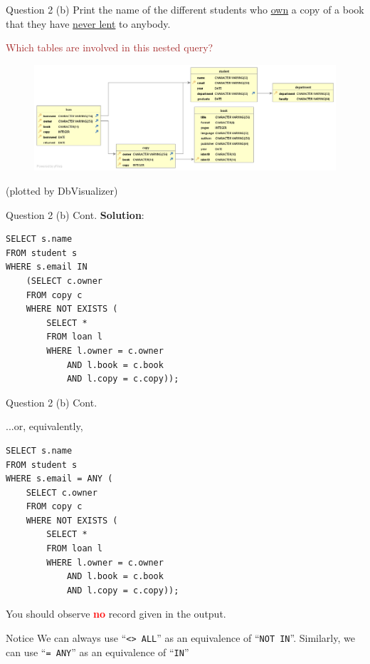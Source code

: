 \begin{frame}[fragile]{Question 2 (b)}
Print the name of the different students who \underline{own} a copy of a book that they have \underline{never lent} to anybody.\\ \vspace{5pt}

\textcolor{brown}{Which tables are involved in this nested query?}
\begin{figure}
	\includegraphics[width=1\textwidth]{t1/images/t1-end.png}
\end{figure}\vspace{-10pt}
{\tiny(plotted by DbVisualizer)}
\end{frame}

\begin{frame}[fragile]{Question 2 (b) Cont.}
\textbf{Solution}:
	
\begin{lstlisting}
SELECT s.name 
FROM student s
WHERE s.email IN 
	(SELECT c.owner
	FROM copy c
	WHERE NOT EXISTS (
		SELECT * 
		FROM loan l
		WHERE l.owner = c.owner
			AND l.book = c.book
			AND l.copy = c.copy));
\end{lstlisting}\vspace{5pt}
\end{frame}

\begin{frame}[fragile]{Question 2 (b) Cont.}
	
...or, equivalently,
	
\begin{lstlisting}
SELECT s.name 
FROM student s
WHERE s.email = ANY (
	SELECT c.owner
	FROM copy c
	WHERE NOT EXISTS (
		SELECT * 
		FROM loan l
		WHERE l.owner = c.owner
			AND l.book = c.book
			AND l.copy = c.copy));
\end{lstlisting}\vspace{5pt}
	
You should observe \textcolor{red}{\textbf{no}} record given in the output. \\

\begin{block}{Notice}
We can always use ``\texttt{<> ALL}'' as an equivalence of ``\texttt{NOT IN}''. Similarly, we can use ``\texttt{= ANY}'' as an equivalence of ``\texttt{IN}''
\end{block}	
\end{frame}

